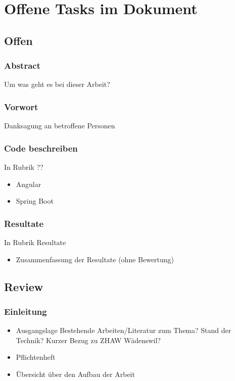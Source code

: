 \documentclass[../main.tex]{subfiles}
\begin{document}
	\section*{Offene Tasks im Dokument}
	\subsection{Offen}
	
	\subsubsection{Abstract}
	Um was geht es bei dieser Arbeit?
	
	\subsubsection{Vorwort}
	Danksagung an betroffene Personen
	
	\subsubsection{Code beschreiben}
	In Rubrik ??
	\begin{itemize}
		\item Angular
		\item Spring Boot
	\end{itemize}
	
	\subsubsection{Resultate}
	In Rubrik Resultate
	\begin{itemize}
		\item Zusammenfassung der Resultate (ohne Bewertung)
	\end{itemize}
	
	
	\subsection{Review}
	\subsubsection{Einleitung}
	\begin{itemize}
		\item Ausgangslage
		\subitem Bestehende Arbeiten/Literatur zum Thema?
		\subitem Stand der Technik?
		\subitem Kurzer Bezug zu ZHAW Wädenswil?
		
		\item Pflichtenheft
		\item Übersicht über den Aufbau  der Arbeit
	\end{itemize}
	
\end{document}
